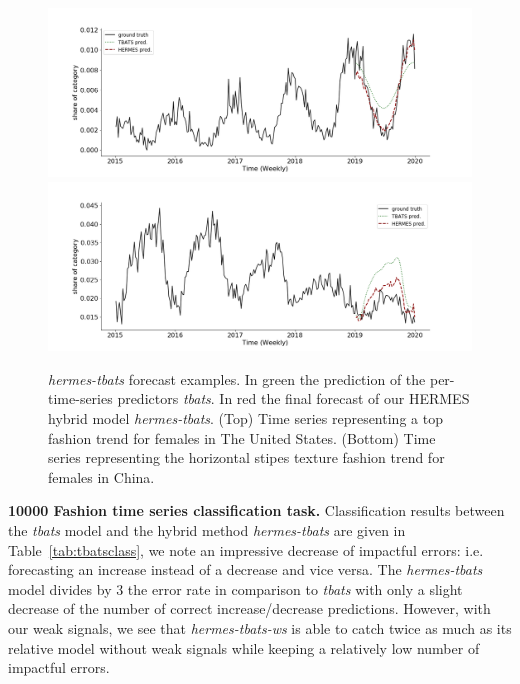 \documentclass[10pt]{article} %
\begin{document}
\begin{figure}
\centering
  \includegraphics[width=1.\linewidth]{us_female_top}
  \includegraphics[width=1.\linewidth]{cn_female_texture_horizontalstripe}
\caption{\textit{hermes-tbats} forecast examples. In green the prediction of the per-time-series predictors \textit{tbats}. In red the final forecast of our HERMES hybrid model \textit{hermes-tbats}. (Top) Time series representing a top fashion trend for females in The United States. (Bottom) Time series representing the horizontal stipes texture fashion trend for females in China.}
\label{fig:examples}
\end{figure}

\textbf{10000 Fashion time series classification task. } Classification results between the \textit{tbats} model and the hybrid method \textit{hermes-tbats} are given in Table~\ref{tab:tbatsclass}, we note an impressive decrease of impactful errors: i.e. forecasting an increase instead of a decrease and vice versa. The \textit{hermes-tbats} model divides by 3 the error rate in comparison to \textit{tbats} with only a slight decrease of the number of correct increase/decrease predictions. However, with our weak signals, we see that \textit{hermes-tbats-ws} is able to catch twice as much as its relative model without weak signals while keeping a relatively low number of impactful errors.
\end{document}
